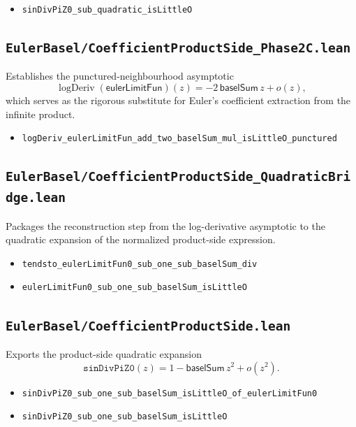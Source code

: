 \documentclass[11pt,a4paper]{article}
\theoremstyle{plain}
\theoremstyle{definition}
\DeclareRobustCommand{\codepath}[1]{\nolinkurl{#1}}
\DeclareRobustCommand{\leanid}[1]{\texttt{#1}}
\DeclareRobustCommand{\codepath}[1]{\nolinkurl{#1}}
\newcommand{\baselSum}{\ensuremath{\mathsf{baselSum}}}
\newcommand{\sinDivPiZZero}{\leanid{sinDivPiZ0}}
\newcommand{\eulerLimitFun}{\ensuremath{\mathsf{eulerLimitFun}}}
\DeclareMathOperator{\logDeriv}{logDeriv}
\begin{document}
\begin{itemize}[leftmargin=2em]
  \item \texttt{sinDivPiZ0\_sub\_quadratic\_isLittleO}
\end{itemize}


\subsection*{\codepath{EulerBasel/CoefficientProductSide\_Phase2C.lean}}

Establishes the punctured-neighbourhood asymptotic
\[
\logDeriv(\eulerLimitFun)(z)
=
-2\,\baselSum\, z
+ o(z),
\]
which serves as the rigorous substitute for Euler’s coefficient extraction
from the infinite product.

\begin{itemize}[leftmargin=2em]
  \item \texttt{logDeriv\_eulerLimitFun\_add\_two\_baselSum\_mul\_isLittleO\_punctured}
\end{itemize}


\subsection*{\codepath{EulerBasel/CoefficientProductSide_QuadraticBridge.lean}}

Packages the reconstruction step from the log-derivative asymptotic to
the quadratic expansion of the normalized product-side expression.

\begin{itemize}[leftmargin=2em]
  \item \texttt{tendsto\_eulerLimitFun0\_sub\_one\_sub\_baselSum\_div}
  \item \texttt{eulerLimitFun0\_sub\_one\_sub\_baselSum\_isLittleO}
\end{itemize}


\subsection*{\codepath{EulerBasel/CoefficientProductSide.lean}}

Exports the product-side quadratic expansion
\[
\sinDivPiZZero(z)
=
1 - \baselSum\, z^{2}
+ o(z^{2}).
\]

\begin{itemize}[leftmargin=2em]
  \item \texttt{sinDivPiZ0\_sub\_one\_sub\_baselSum\_isLittleO\_of\_eulerLimitFun0}
  \item \texttt{sinDivPiZ0\_sub\_one\_sub\_baselSum\_isLittleO}
\end{itemize}
\end{document}
